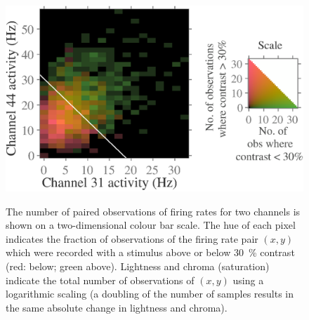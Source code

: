 \begin{figure}[htbp]
{        \includegraphics[scale=.4]{figs/decoding/lindiscrimexLCH-RG-log_cbl_v1_blanco_359_31vs44.eps}}
    \hspace*{\fill}\hspace{.2cm}\hspace*{\fill}
    \caption{
    The number of paired observations of firing rates for two channels is shown on a two-dimensional colour bar scale.
    The hue of each pixel indicates the fraction of observations of the firing rate pair $(x,y)$ which were recorded with a stimulus above or below \SI{30}{\percent} contrast (red: below; green above).
    Lightness and chroma (saturation) indicate the total number of observations of $(x,y)$ using a logarithmic scaling (a doubling of the number of samples results in the same absolute change in lightness and chroma).
}
\end{figure}
